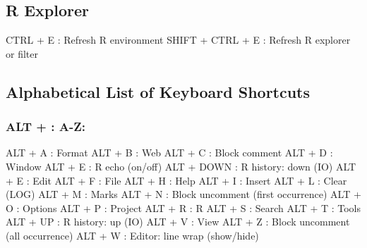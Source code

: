 \hypertarget{basic_card_rexplorer}{}
\subsection{R Explorer}

\vspace{-0.5cm}
\begin{Rtables}[caption={[R explorer keyboard shortcuts]
    R explorer keyboard shortcuts},
  label=shortcut:rexplorer]
  CTRL  + E               : Refresh R environment
  SHIFT + CTRL + E        : Refresh R explorer or filter
\end{Rtables}


\hypertarget{basic_card_alphabetical}{}
\subsection{Alphabetical List of Keyboard Shortcuts}


\subsubsection{ALT + : A-Z:}

\vspace{-0.5cm}
\begin{Rtables}[caption={[ALT keyboard shortcuts]
    ALT Keyboard Shortcuts},
  label=shortcut:alt]
  ALT + A                 : Format
  ALT + B                 : Web
  ALT + C                 : Block comment
  ALT + D                 : Window
  ALT + E                 : R echo (on/off)
  ALT + DOWN              : R history: down (IO)
  ALT + E                 : Edit
  ALT + F                 : File
  ALT + H                 : Help
  ALT + I                 : Insert
  ALT + L                 : Clear (LOG)
  ALT + M                 : Marks
  ALT + N                 : Block uncomment (first occurrence)
  ALT + O                 : Options
  ALT + P                 : Project
  ALT + R                 : R
  ALT + S                 : Search
  ALT + T                 : Tools
  ALT + UP                : R history: up (IO)
  ALT + V                 : View
  ALT + Z                 : Block uncomment (all occurrence)
  ALT + W                 : Editor: line wrap (show/hide)
\end{Rtables}


